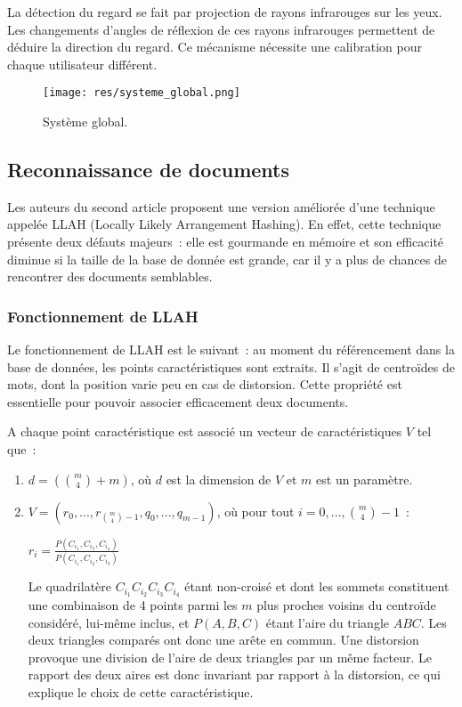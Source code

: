 \documentclass[a4paper]{article}
\begin{document}
La détection du regard se fait par projection de rayons infrarouges sur les yeux. Les changements d'angles de réflexion de ces rayons infrarouges permettent de déduire la direction du regard. Ce mécanisme nécessite une calibration pour chaque utilisateur différent.

\begin{figure}[!h]
\centering
\texttt{[image: res/systeme\_global.png]}
\caption{\label{fig:system}Système global.}
\end{figure}

\subsection{Reconnaissance de documents}
\label{subsec:reconnaissance}

Les auteurs du second article proposent une version améliorée d'une technique appelée LLAH (Locally Likely Arrangement Hashing). En effet, cette technique présente deux défauts majeurs~: elle est gourmande en mémoire et son efficacité diminue si la taille de la base de donnée est grande, car il y a plus de chances de rencontrer des documents semblables.

\subsubsection{Fonctionnement de LLAH}
Le fonctionnement de LLAH est le suivant~: au moment du référencement dans la base de données, les points caractéristiques sont extraits. Il s'agit de centroïdes de mots, dont la position varie peu en cas de distorsion. Cette propriété est essentielle pour pouvoir associer efficacement deux documents.

A chaque point caractéristique est associé un vecteur de caractéristiques $V$ tel que~:
\begin{enumerate}
	\item $d = ({m\choose 4} + m)$, où $d$ est la dimension de $V$ et $m$ est un paramètre.
	\item $V = (r_0, ..., r_{{m\choose 4}-1}, q_0, ..., q_{m-1})$, où pour tout $i = 0, ..., {m\choose 4}-1$~:
	
	$r_i = \frac{P(C_{i_1}, C_{i_3}, C_{i_4})}{P(C_{i_1}, C_{i_2}, C_{i_3})}$
	
	Le quadrilatère $C_{i_1}C_{i_2}C_{i_3}C_{i_4}$ étant non-croisé et dont les sommets constituent une combinaison de 4 points parmi les $m$ plus proches voisins du centroïde considéré, lui-même inclus, et $P(A,B,C)$ étant l'aire du triangle $ABC$. Les deux triangles comparés ont donc une arête en commun. Une distorsion provoque une division de l'aire de deux triangles par un même facteur. Le rapport des deux aires est donc invariant par rapport à la distorsion, ce qui explique le choix de cette caractéristique.
\end{enumerate}
\end{document}
